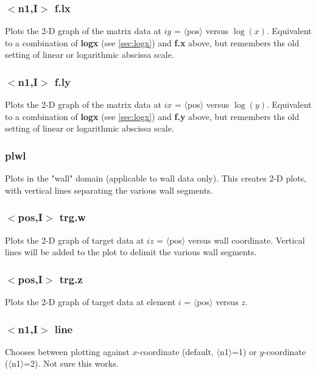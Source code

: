 \documentclass[a4paper,10pt]{report}
\begin{document}
\subsubsection{$<$n1,{\bf I}$>$ f.lx}\label{sec:f.lx}
Plots the 2-D graph of the matrix data at $iy$ = $\langle$pos$\rangle$ versus $\log(x)$.
Equivalent to a combination of {\bf logx} (see \ref{sec:logx}) and {\bf f.x} above,
but remembers ths old setting of linear or logarithmic abscissa scale.

\subsubsection{$<$n1,{\bf I}$>$ f.ly}\label{sec:f.ly}
Plots the 2-D graph of the matrix data at $ix$ = $\langle$pos$\rangle$ versus $\log(y)$.
Equivalent to a combination of {\bf logx} (see \ref{sec:logx}) and {\bf f.y} above,
but remembers ths old setting of linear or logarithmic abscissa scale.

\subsubsection{plwl}\label{sec:plwl}
Plots in the "wall" domain (applicable to wall data only).
This creates 2-D plots, with vertical lines separating
the various wall segments.

\subsubsection{$<$pos,{\bf I}$>$ trg.w}\label{sec:trg.w}
Plots the 2-D graph of target data at $iz$ = $\langle$pos$\rangle$ versus wall coordinate.
Vertical lines will be added to the plot to delimit
the various wall segments.

\subsubsection{$<$pos,{\bf I}$>$ trg.z}\label{sec:trg.z}
Plots the 2-D graph of target data at element $i$ = $\langle$pos$\rangle$ versus $z$.

\subsubsection{$<$n1,{\bf I}$>$ line}\label{sec:line}
Chooses between plotting against $x$-coordinate (default, $\langle$n1$\rangle$=1)
or $y$-coordinate ($\langle$n1$\rangle$=2). Not sure this works.
\end{document}
